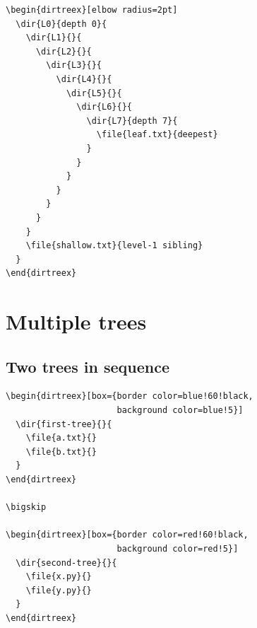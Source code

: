 \documentclass[11pt]{article}
\begin{document}
\begin{Verbatim}
\begin{dirtreex}[elbow radius=2pt]
  \dir{L0}{depth 0}{
    \dir{L1}{}{
      \dir{L2}{}{
        \dir{L3}{}{
          \dir{L4}{}{
            \dir{L5}{}{
              \dir{L6}{}{
                \dir{L7}{depth 7}{
                  \file{leaf.txt}{deepest}
                }
              }
            }
          }
        }
      }
    }
    \file{shallow.txt}{level-1 sibling}
  }
\end{dirtreex}
\end{Verbatim}

\begin{dirtreex}[elbow radius=2pt]
\end{dirtreex}

\clearpage

\section{Multiple trees}

\subsection{Two trees in sequence}

\begin{Verbatim}
\begin{dirtreex}[box={border color=blue!60!black,
                      background color=blue!5}]
  \dir{first-tree}{}{
    \file{a.txt}{}
    \file{b.txt}{}
  }
\end{dirtreex}

\bigskip

\begin{dirtreex}[box={border color=red!60!black,
                      background color=red!5}]
  \dir{second-tree}{}{
    \file{x.py}{}
    \file{y.py}{}
  }
\end{dirtreex}
\end{Verbatim}

\begin{dirtreex}[box={border color=blue!60!black,
                      background color=blue!5}]
\end{dirtreex}
\end{document}
